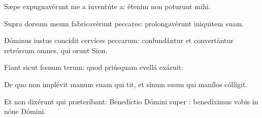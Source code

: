 \item {}

\item Sæpe expugnavérunt me a iuventúte a:\psstar{} étenim non poturunt mihi.

\item Supra dorsum meum fabricavérunt peccares:\psstar{} prolongavérunt iniquitem suam.

\item Dóminus iustus concídit cervíces peccarum:\psstar{} confundántur et convertántur retrórsum omnes, qui orunt Sion.

\item Fiant sicut fœnum terum:\psstar{} quod priúsquam evellá exáruit:

\item De quo non implévit manum suam qui tit,\psstar{} et sinum suum qui manílos cólligit.

\item Et non dixérunt qui præteríbant: Benedíctio Dómini super :\psstar{} benedíximus vobis in nóne Dómini.

